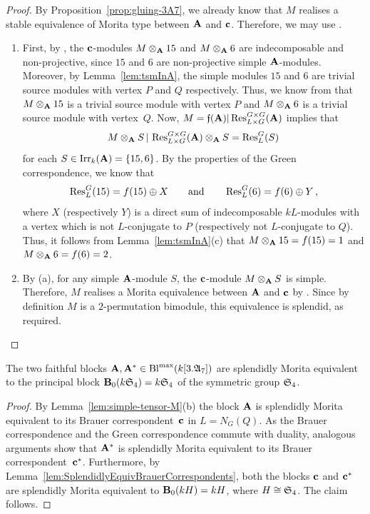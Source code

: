 \begin{proof}
By Proposition~\ref{prop:gluing-3A7}, we already know that $M$ realises a stable equivalence of Morita type between ${\mathbf{A}}$ and ${\mathbf{c}}$. Therefore, we may use \cite[Theorem 2.1(ii) and (iii)]{Lin96StableEqs}. 
\begin{enumerate}[label={\rm(\alph*)}]
    \item First, by \cite[Theorem 2.1(ii)]{Lin96StableEqs}, the ${\mathbf{c}}$-modules $M\otimes_{{\mathbf{A}}}15$ and $M\otimes_{{\mathbf{A}}}6$ are indecomposable and non-projective, since $15$ and $6$ are non-projective simple ${\mathbf{A}}$-modules. 
    Moreover, by Lemma~\ref{lem:tsmInA}, the simple modules $15$ and $6$ are trivial source modules with vertex $P$ and $Q$ respectively. Thus, we know from \cite[Lemma A.3(ii) and (iii)]{KMN11} that $M\otimes_{{\mathbf{A}}}15$ is a trivial source module with vertex $P$ and 
    $M\otimes_{{\mathbf{A}}}6$ is a trivial source module with vertex~$Q$.
    Now, $M=\mathfrak{f}({\mathbf{A}})|\operatorname{Res}^{G\times G}_{L\times G}(\mathfrak{{\mathbf{A}}})$
    implies that 
    \[
    M\otimes_{{\mathbf{A}}}S\,|\,\operatorname{Res}^{G\times G}_{L\times G}(\mathfrak{{\mathbf{A}}})\otimes_{{\mathbf{A}}}S=\operatorname{Res}^G_L(S)
    \]
    for each $S\in \operatorname{Irr}_k({\mathbf{A}})=\{15,6\}$. 
    By the properties of the Green correspondence, we know that 
    \[
        \operatorname{Res}^G_L(15)=f(15)\oplus X\qquad\text{and}\qquad\operatorname{Res}^G_L(6)=f(6)\oplus Y\,,
    \] 
    where $X$ (respectively $Y$) is a direct sum of indecomposable $kL$-modules with a vertex which is not $L$-conjugate to $P$ (respectively not $L$-conjugate to $Q$). Thus, it follows from Lemma~\ref{lem:tsmInA}(c) that $M\otimes_{{\mathbf{A}}}15=f(15)=1$ and $M\otimes_{{\mathbf{A}}}6=f(6)=2$. 

    \item By (a), for any simple ${\mathbf{A}}$-module $S$, the ${\mathbf{c}}$-module $M\otimes_{{\mathbf{A}}}S$ is simple.  Therefore, $M$ realises a Morita equivalence between ${\mathbf{A}}$ and ${\mathbf{c}}$ by \cite[Theorem~2.1(iii)]{Lin96StableEqs}.
    Since by definition $M$ is a  $2$-permutation bimodule, this equivalence is splendid, as required.
\end{enumerate}
\end{proof}

\begin{thm}\label{thm:FaithfulBlocks3A7}%
    The two faithful blocks ${\mathbf{A}},{\mathbf{A}}^\ast\in\operatorname{Bl}^{\mathrm{max}}(k[3.{\mathfrak{A}}_7])$ are splendidly Morita equivalent to the principal block ${\mathbf{B}}_0(k{\mathfrak{S}}_4)=k{\mathfrak{S}}_4$ of the symmetric group ${\mathfrak{S}}_4$.
\end{thm}

\begin{proof}
By Lemma~\ref{lem:simple-tensor-M}(b) the block ${\mathbf{A}}$ is splendidly Morita equivalent to its Brauer correspondent~${\mathbf{c}}$ in $L=N_G(Q)$. As the Brauer correspondence and the Green correspondence commute with duality, analogous arguments show that ${\mathbf{A}}^\ast$ is splendidly Morita equivalent to its Brauer correspondent~${\mathbf{c}}^\ast$. 
Furthermore, by Lemma~\ref{lem:SplendidlyEquivBrauerCorrespondents}, both the blocks ${\mathbf{c}}$ and ${\mathbf{c}}^\ast$ are splendidly Morita equivalent to ${\mathbf{B}}_0(kH)=kH$, where $H\cong {\mathfrak{S}}_4$. The claim follows. 
\end{proof}

